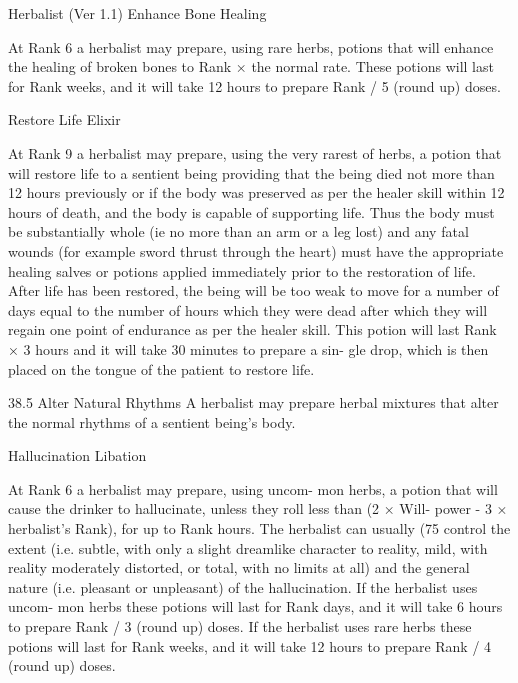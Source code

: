 \begin{Chapter}{Herbalist (Ver 1.1)}
Enhance Bone Healing 

At  Rank  6  a  herbalist  may  prepare,  using  rare 
herbs,  potions  that  will  enhance  the  healing  of 
broken  bones  to  Rank  ×  the  normal  rate.  These 
potions will last for Rank weeks, and it will take 12 
hours to prepare Rank / 5 (round up) doses. 

Restore Life Elixir 

At Rank 9 a herbalist may prepare, using the very 
rarest  of  herbs,  a  potion  that  will  restore  life  to  a 
sentient  being  providing  that  the  being  died  not 
more  than  12  hours  previously  or  if  the  body  was 
preserved as per the healer skill within 12 hours of 
death,  and  the  body  is  capable  of  supporting  life. 
Thus  the  body  must  be  substantially  whole  (ie  no 
more  than  an  arm  or  a  leg  lost)  and  any  fatal 
wounds  (for  example  sword  thrust  through  the 
heart)  must  have  the  appropriate  healing  salves  or 
potions applied immediately prior to the restoration 
of  life.  After  life  has  been  restored,  the  being  will 
be too weak to move for a number of days equal to 
the  number  of  hours  which  they  were  dead  after 
which  they  will  regain  one  point  of  endurance  as 
per the healer skill. This potion will  last Rank × 3 
hours and it will take 30 minutes to prepare a sin-
gle drop, which is then placed on the tongue of the 
patient to restore life. 

38.5 Alter Natural Rhythms 
A  herbalist  may  prepare  herbal  mixtures  that  alter 
the normal rhythms of a sentient being’s body. 

Hallucination Libation 

At  Rank  6  a  herbalist  may  prepare,  using  uncom-
mon  herbs,  a  potion  that  will  cause  the  drinker  to 
hallucinate,  unless  they  roll  less  than  (2  ×  Will-
power  -  3  ×  herbalist’s  Rank),  for  up  to  Rank 
hours.  The  herbalist  can  usually  (75%
control  the  extent  (i.e.  subtle,  with  only  a  slight 
dreamlike  character  to  reality,  mild,  with  reality 
moderately distorted, or total, with no limits at all) 
and the general nature (i.e. pleasant or unpleasant) 
of  the  hallucination.  If  the  herbalist  uses  uncom-
mon  herbs  these  potions  will  last  for  Rank  days, 
and it will take 6 hours to prepare Rank / 3 (round 
up)  doses.  If  the  herbalist  uses  rare  herbs  these 
potions will last for Rank weeks, and it will take 12 
hours to prepare Rank / 4 (round up) doses. 


\end{Chapter}
